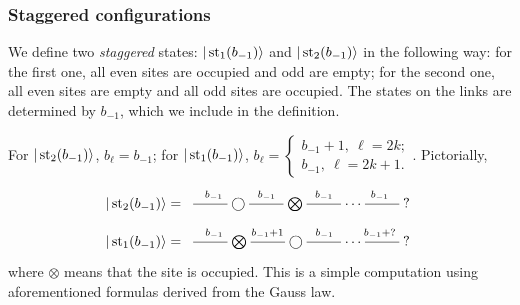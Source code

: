	\subsubsection{Staggered configurations}
 We define two \emph{staggered} states: $|\operatorname{st}_1(b_{-1})\rangle$ and $|\operatorname{st}_2(b_{-1})\rangle$ in the following way: for the first one, all even sites are occupied and odd are empty; for the second one, all even sites are empty and all odd sites are occupied. The states on the links are determined by $b_{-1}$, which we include in the definition. 
\begin{statement}
For $|\operatorname{st}_2(b_{-1})\rangle$, $
b_{\ell} = b_{-1}$; for $|\operatorname{st}_1(b_{-1})\rangle$, $
b_{\ell} = \begin{cases}
b_{-1} + 1, \ \ell = 2k;\\
b_{-1}, \ \ell = 2k+1.
\end{cases}$. Pictorially,
\[
|\st_2(b_{-1})\rangle =	\xymatrix{
	\ar@{-}[r]^{b_{-1}} & \bigcirc \ar@{-}[r]^{b_{-1}} &  \bigotimes \ar@{-}[r]^{b_{-1}} & \cdots & \ar@{-}[l]_{b_{-1}} ?
	}
\]
\[
|\st_1(b_{-1})\rangle =	\xymatrix{
	\ar@{-}[r]^{b_{-1}} & \bigotimes \ar@{-}[r]^{b_{-1}+1} &  \bigcirc \ar@{-}[r]^{b_{-1}} & \cdots & \ar@{-}[l]_{b_{-1}+?} ?
	}
\]
where $\otimes$ means that the site is occupied. This is a simple computation using aforementioned formulas derived from the Gauss law.
\end{statement}

